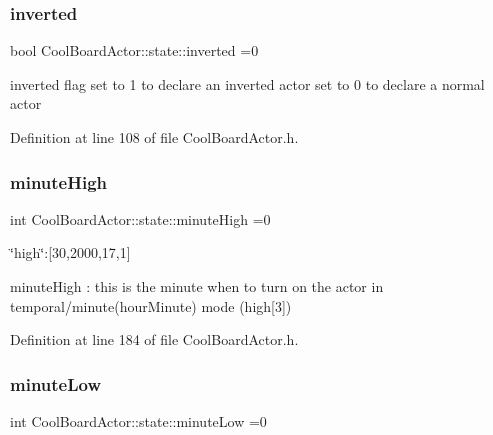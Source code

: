 \mbox{\label{struct_cool_board_actor_1_1state_aa4fdca81973fd7b29541877db1cf27bd}} 
\subsubsection{\texorpdfstring{inverted}{inverted}}
{\footnotesize\ttfamily bool Cool\+Board\+Actor\+::state\+::inverted =0}

inverted flag set to 1 to declare an inverted actor set to 0 to declare a normal actor 

Definition at line 108 of file Cool\+Board\+Actor.\+h.

\mbox{\label{struct_cool_board_actor_1_1state_a4bff3d61ead74adb60be224764b93006}} 
\subsubsection{\texorpdfstring{minute\+High}{minuteHigh}}
{\footnotesize\ttfamily int Cool\+Board\+Actor\+::state\+::minute\+High =0}

\char`\"{}high\char`\"{}\+:\mbox{[}30,2000,17,1\mbox{]}

minute\+High \+: this is the minute when to turn on the actor in temporal/minute(hour\+Minute) mode (high\mbox{[}3\mbox{]}) 

Definition at line 184 of file Cool\+Board\+Actor.\+h.

\mbox{\label{struct_cool_board_actor_1_1state_acbcc2902331fd9d757cd475eb403bdd9}} 
\subsubsection{\texorpdfstring{minute\+Low}{minuteLow}}
{\footnotesize\ttfamily int Cool\+Board\+Actor\+::state\+::minute\+Low =0}

